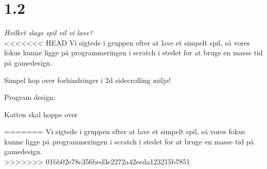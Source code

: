 \section{1.2}

\textit{Hvilket slags spil vil vi lave?}\\
<<<<<<< HEAD
Vi sigtede i gruppen efter at lave et simpelt spil, så vores fokus kunne ligge på programmeringen i scratch i stedet for at bruge en masse tid på gamedesign.

Simpel hop over forhindringer i 2d sidecrolling miljø!

Program design:

Katten skal hoppe over 

=======
Vi sigtede i gruppen efter at lave et simpelt spil,
så vores fokus kunne ligge på programmeringen i scratch
i stedet for at bruge en masse tid på gamedesign.\\
>>>>>>> 01bb02e78c356bed3e2272a42eeda123215b7851


